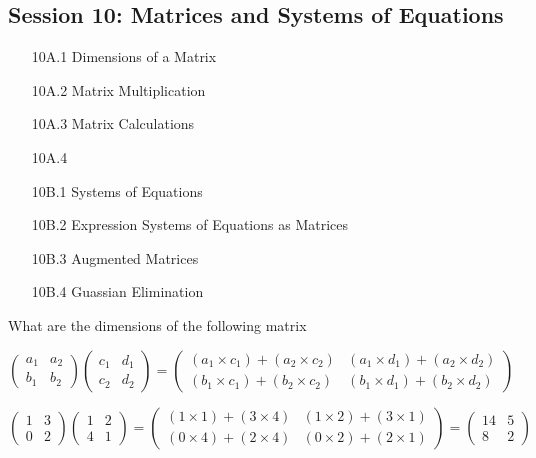\begin{itemize}
\newpage
\section*{Session 10: Matrices and Systems of Equations}
\begin{itemize}
\item[10A.1] Dimensions of a Matrix
\item[10A.2] Matrix Multiplication
\item[10A.3] Matrix Calculations
\item[10A.4] 
\end{itemize}

\begin{itemize}
\item[10B.1] Systems of Equations
\item[10B.2] Expression Systems of Equations as Matrices
\item[10B.3] Augmented Matrices
\item[10B.4] Guassian Elimination
\end{itemize}



What are the dimensions of the following matrix


\[ \left(
\begin{array}{cc}
a_1 & a_2 \\ 
b_1 & b_2
\end{array} \right)\left(
\begin{array}{cc}
c_1 & d_1 \\ 
c_2 & d_2
\end{array} \right) = \left(
\begin{array}{cc}
(a_1 \times c_1) + (a_2 \times c_2) & (a_1 \times d_1) + (a_2 \times d_2) \\ 
(b_1 \times c_1) + (b_2 \times c_2) & (b_1 \times d_1) + (b_2 \times d_2)
\end{array} \right) \]

\bigskip
\large{
\[ \left(
\begin{array}{cc}
1 & 3 \\ 
0 & 2
\end{array} \right)\left(
\begin{array}{cc}
1 & 2 \\ 
4 & 1
\end{array} \right) = \left(
\begin{array}{cc}
(1 \times 1) + (3 \times 4) & (1 \times 2) + (3 \times 1) \\ 
(0 \times 4) + (2 \times 4) & (0 \times 2) + (2 \times 1)
\end{array} \right) = \left(
\begin{array}{cc}
14 & 5 \\ 
8 & 2
\end{array} \right) \]
}


\end{itemize}
